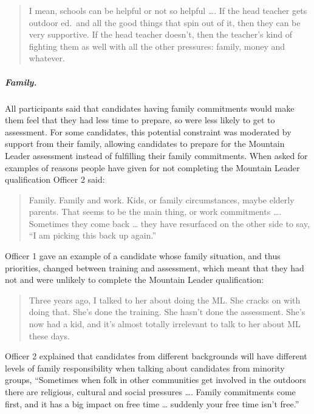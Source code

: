 \documentclass[
  12pt,
  a4paper,
]{book}
\begin{document}
\begin{quote}
I mean, schools can be helpful or not so helpful \ldots. If the head teacher gets outdoor ed.~and all the good things that spin out of it, then they can be very supportive. If the head teacher doesn't, then the teacher's kind of fighting them as well with all the other pressures: family, money and whatever.
\end{quote}

\hypertarget{qual-lack-time-familiy}{%
\subparagraph{Family.}\label{qual-lack-time-familiy}}

All participants said that candidates having family commitments would make them feel that they had less time to prepare, so were less likely to get to assessment. For some candidates, this potential constraint was moderated by support from their family, allowing candidates to prepare for the Mountain Leader assessment instead of fulfilling their family commitments. When asked for examples of reasons people have given for not completing the Mountain Leader qualification Officer 2 said:

\begin{quote}
Family. Family and work. Kids, or family circumstances, maybe elderly parents. That seems to be the main thing, or work commitments \ldots. Sometimes they come back \ldots{} they have resurfaced on the other side to say, ``I am picking this back up again.''
\end{quote}

Officer 1 gave an example of a candidate whose family situation, and thus priorities, changed between training and assessment, which meant that they had not and were unlikely to complete the Mountain Leader qualification:

\begin{quote}
Three years ago, I talked to her about doing the ML. She cracks on with doing that. She's done the training. She hasn't done the assessment. She's now had a kid, and it's almost totally irrelevant to talk to her about ML these days.
\end{quote}

Officer 2 explained that candidates from different backgrounds will have different levels of family responsibility when talking about candidates from minority groups, ``Sometimes when folk in other communities get involved in the outdoors there are religious, cultural and social pressures \ldots. Family commitments come first, and it has a big impact on free time \ldots{} suddenly your free time isn't free.''
\end{document}
